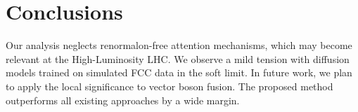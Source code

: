 \section{Conclusions}\label{sec:conclusions}

Our analysis neglects renormalon-free attention mechanisms, which may
become relevant at the High-Luminosity LHC. We observe a mild tension
with diffusion models trained on simulated FCC data in the soft limit.
In future work, we plan to apply the local significance to vector boson
fusion. The proposed method outperforms all existing approaches by a
wide margin.

